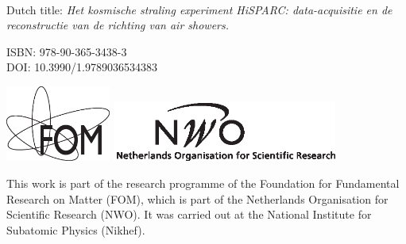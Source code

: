 \thispagestyle{empty}

\begin{center}

\vspace*{2cm}

\\[1em]
\end{center}

\clearpage

\vspace*{\fill}

\noindent
Dutch title: \emph{Het kosmische straling experiment HiSPARC:
data-acquisitie en de reconstructie van de richting van air showers.}

\vspace{1cm}

\noindent
ISBN: 978-90-365-3438-3 \\
DOI: 10.3990/1.9789036534383

\vspace{3cm}

\includegraphics[height=2.5cm]{figures/FOMlogo_zw}
\hfill
\includegraphics[height=2cm]{figures/2d_NWO_LogoBasis_Zw}

\vspace{.5cm}

\noindent
This work is part of the research programme of the Foundation for
Fundamental Research on Matter (FOM), which is part of the Netherlands
Organisation for Scientific Research (NWO).  It was carried out at the
National Institute for Subatomic Physics (Nikhef).



\cleardoublepage
\thispagestyle{empty}

